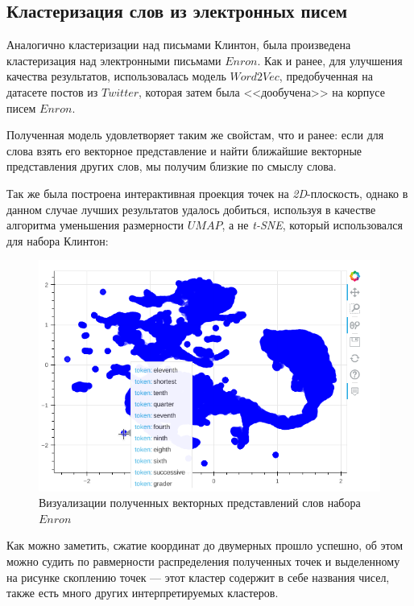 \subsection{Кластеризация слов из электронных писем}

Аналогично кластеризации над письмами Клинтон, была произведена кластеризация над 
электронными письмами $Enron$. Как и ранее, для улучшения качества результатов,
использовалась модель $Word2Vec$, предобученная на датасете постов из $Twitter$, которая затем была <<дообучена>> на корпусе писем $Enron$.

Полученная модель удовлетворяет таким же свойстам, что и ранее: если для слова
взять его векторное представление и найти ближайшие векторные представления других слов, мы
получим близкие по смыслу слова.

Так же была построена интерактивная проекция точек на \textit{2D}-плоскость, однако в данном случае лучших результатов удалось добиться, используя в качестве алгоритма уменьшения размерности $UMAP$, а не \textit{t-SNE}, который использовался для набора Клинтон:

\begin{figure}[H]
\centering
\includegraphics[scale=0.9]{pics/points-2.png}
\caption{Визуализации полученных векторных представлений слов набора $Enron$}
\end{figure}

Как можно заметить, сжатие координат до двумерных прошло успешно, об этом можно судить 
по равмерности распределения полученных точек и выделенному на рисунке скоплению точек ---
этот кластер содержит в себе названия чисел, также есть много других интерпретируемых кластеров.


